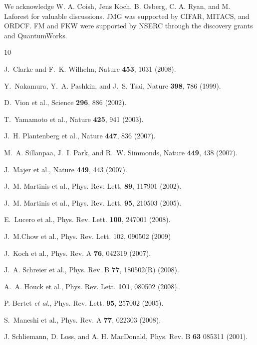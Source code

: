 \documentclass[prl,twocolumn,aps,final,floatfix,superscriptaddress,showpacs]{revtex4}
\begin{document}
\begin{acknowledgments}
We acknowledge W. A. Coish, Jens Koch, B. Osberg, C. A. Ryan, and M. Laforest for valuable discussions. JMG was supported by CIFAR, MITACS, and ORDCF. FM and FKW were supported by NSERC through the discovery grants and QuantumWorks.
\end{acknowledgments}

\begin{thebibliography}{10}
\newcommand{\enquote}[1]{``#1''}

J.~Clarke and F.~K. Wilhelm, Nature \textbf{453}, 1031 (2008).

Y.~Nakamura, Y.~A. Pashkin, and J.~S. Tsai, Nature \textbf{398}, 786 (1999).

D.~Vion et al., Science \textbf{296}, 886 (2002).

T.~Yamamoto et al., Nature \textbf{425}, 941 (2003).

J.~H. Plantenberg et al., Nature \textbf{447}, 836 (2007).

M.~A. Sillanpaa, J.~I. Park, and R.~W. Simmonds, Nature \textbf{449}, 438
  (2007).

J.~Majer et al., Nature \textbf{449}, 443 (2007).


J.~M. Martinis et al., Phys. Rev. Lett.
  \textbf{89}, 117901 (2002).

J.~M. Martinis et al., Phys.
  Rev. Lett. \textbf{95}, 210503 (2005).

E.~Lucero et al., Phys. Rev. Lett.
  \textbf{100}, 247001 (2008).


J.~M.Chow et al., Phys. Rev. Lett. 102, 090502 (2009)

J.~Koch et al., Phys. Rev. A
  \textbf{76}, 042319 (2007).


 J.~A. Schreier et al., Phys. Rev. B \textbf{77}, 180502(R) (2008).

A.~A. Houck et al., Phys. Rev. Lett. \textbf{101}, 080502 (2008).


P. Bertet {\em et al.}, Phys. Rev. Lett. {\bf 95}, 257002 (2005).


S.~Maneshi et al., Phys. Rev.
  A \textbf{77}, 022303 (2008).

J. Schliemann, D. Loss, and A. H. MacDonald, Phys. Rev. B \textbf{63} 085311 (2001).


\end{thebibliography}
\end{document}
